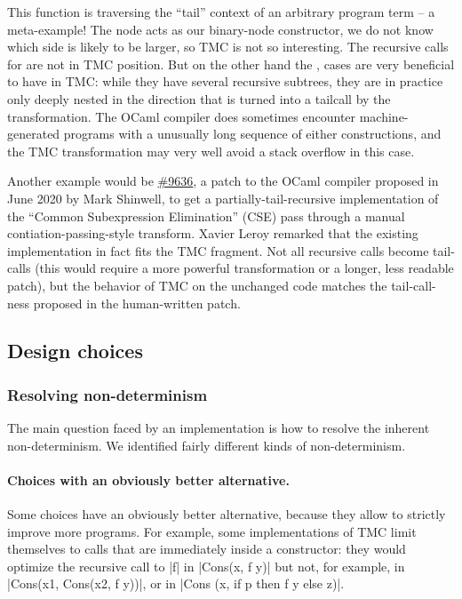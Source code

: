This function is traversing the ``tail'' context of an arbitrary
program term -- a meta-example! The  node acts as
our binary-node constructor, we do not know which side is likely to be
larger, so TMC is not so interesting. The recursive calls for
 are not in TMC position. But on the other hand the
,  cases are very beneficial to have in
TMC: while they have several recursive subtrees, they are in practice
only deeply nested in the direction that is turned into a tailcall by
the transformation. The OCaml compiler does sometimes encounter
machine-generated programs with a unusually long sequence of either
constructions, and the TMC transformation may very well avoid a stack
overflow in this case.

Another example would be
\href{https://github.com/ocaml/ocaml/pull/9636}{\#9636}, a patch to
the OCaml compiler proposed in June 2020 by Mark Shinwell, to get
a partially-tail-recursive implementation of the ``Common
Subexpression Elimination'' (CSE) pass through a manual
contiation-passing-style transform. Xavier Leroy remarked that the
existing implementation in fact fits the TMC fragment. Not all
recursive calls become tail-calls (this would require a more powerful
transformation or a longer, less readable patch), but the behavior of
TMC on the unchanged code matches the tail-call-ness proposed in the
human-written patch.

\subsection{Design choices}

\subsubsection{Resolving non-determinism}

The main question faced by an implementation is how to resolve the
inherent non-determinism. We identified fairly different kinds of
non-determinism.

\paragraph{Choices with an obviously better alternative.} Some choices
have an obviously better alternative, because they allow to strictly
improve more programs. For example, some implementations of TMC limit
themselves to calls that are immediately inside a constructor: they
would optimize the recursive call to \ocaml|f| in \ocaml|Cons(x, f y)|
but not, for example, in \ocaml|Cons(x1, Cons(x2, f y))|, or in
\ocaml|Cons (x, if p then f y else z)|.

